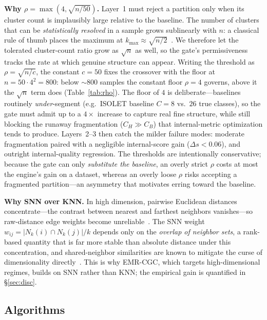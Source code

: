 \documentclass[journal]{IEEEtran}
\begin{document}
\textbf{Why $\rho=\max(4,\sqrt{n/50})$.} Layer~1 must reject a partition only when its cluster count is implausibly large relative to the baseline. The number of clusters that can be \emph{statistically resolved} in a sample grows sublinearly with $n$: a classical rule of thumb places the maximum at $k_{\max}\approx\sqrt{n/2}$~\cite{mardia1979multivariate}. We therefore let the tolerated cluster-count ratio grow as $\sqrt{n}$ as well, so the gate's permissiveness tracks the rate at which genuine structure can appear. Writing the threshold as $\rho=\sqrt{n/c}$, the constant $c{=}50$ fixes the crossover with the floor at $n=50\cdot4^2=800$: below ${\sim}800$ samples the constant floor $\rho{=}4$ governs, above it the $\sqrt{n}$ term does (Table~\ref{tab:rho}). The floor of $4$ is deliberate---baselines routinely \emph{under}-segment (e.g.\ ISOLET baseline $C{=}8$ vs.\ $26$ true classes), so the gate must admit up to a $4\times$ increase to capture real fine structure, while still blocking the runaway fragmentation ($C_H\!\gg\!C_B$) that internal-metric optimization tends to produce. Layers~2--3 then catch the milder failure modes: moderate fragmentation paired with a negligible internal-score gain ($\Delta s<0.06$), and outright internal-quality regression. The thresholds are intentionally conservative; because the gate can only \emph{substitute the baseline}, an overly strict $\rho$ costs at most the engine's gain on a dataset, whereas an overly loose $\rho$ risks accepting a fragmented partition---an asymmetry that motivates erring toward the baseline.



\textbf{Why SNN over KNN.} In high dimension, pairwise Euclidean distances concentrate---the contrast between nearest and farthest neighbors vanishes---so raw-distance edge weights become unreliable~\cite{beyer1999nearest}. The SNN weight $w_{ij}=|N_k(i)\cap N_k(j)|/k$ depends only on the \emph{overlap of neighbor sets}, a rank-based quantity that is far more stable than absolute distance under this concentration, and shared-neighbor similarities are known to mitigate the curse of dimensionality directly~\cite{houle2010shared}. This is why EMR-CGC, which targets high-dimensional regimes, builds on SNN rather than KNN; the empirical gain is quantified in \S\ref{sec:disc}.

\subsection{Algorithms}
\end{document}
